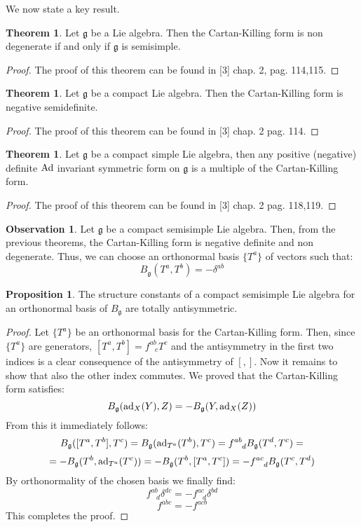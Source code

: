 \documentclass[12pt,a4paper]{report}
\theoremstyle{definition}
\theoremstyle{Theorem}
\newtheorem{Theo}[Def]{Theorem}
\newtheorem{Prop}[Def]{Proposition}
\theoremstyle{definition}
\theoremstyle{definition}
\newtheorem{Obs}[Def]{Observation}
\begin{document}
	We now state a key result.
	\begin{Theo}\label{Theo_2.8.2}
		Let $\mathfrak{g}$ be a Lie algebra. Then the Cartan-Killing form is non degenerate if and only if $\mathfrak{g}$ is semisimple.
	\end{Theo}
	\begin{proof}
		The proof of this theorem can be found in [3] chap. 2, pag. 114,115.
	\end{proof}
	\begin{Theo}
		Let $\mathfrak{g}$ be a compact Lie algebra. Then the Cartan-Killing form is negative semidefinite.
	\end{Theo}
	\begin{proof}
		The proof of this theorem can be found in [3] chap. 2 pag. 114.
	\end{proof}
	\begin{Theo}
		Let $\mathfrak{g}$ be a compact simple Lie algebra, then any positive (negative) definite $\hbox{Ad}$ invariant symmetric form on $\mathfrak{g}$ is a multiple of the Cartan-Killing form.
	\end{Theo}
	\begin{proof}
		The proof of this theorem can be found in [3] chap. 2 pag. 118,119.
	\end{proof}
	\begin{Obs}
		Let $\mathfrak{g}$ be a compact semisimple Lie algebra. Then, from the previous theorems, the Cartan-Killing form is negative definite and non degenerate. Thus, we can choose an orthonormal basis $\{T^a\}$ of vectors such that:
		$$B_{\mathfrak{g}}(T^a,T^b)=-\delta^{ab}$$
	\end{Obs}
	\begin{Prop}\label{Prop_2.8.3}
		The structure constants of a compact semisimple Lie algebra for an orthonormal basis of $B_\mathfrak{g}$ are totally antisymmetric.
	\end{Prop}
	\begin{proof}
		Let $\{T^a\}$ be an orthonormal basis for the Cartan-Killing form. Then, since $\{T^a\}$ are generators, $[T^a,T^b]=f^{ab}_{\hspace{9pt}c}T^c$ and the antisymmetry in the first two indices is a clear consequence of the antisymmetry of $[,]$. Now it remains to show that also the other index commutes. 
		We proved that the Cartan-Killing form satisfies:
		$$B_\mathfrak{g}(\hbox{ad}_X(Y),Z)=-B_\mathfrak{g}(Y,\hbox{ad}_X(Z))$$
		From this it immediately follows:
		$$B_\mathfrak{g}([T^a,T^b],T^c)=B_\mathfrak{g}(\hbox{ad}_{T^a}(T^b),T^c)=f^{ab}_{\hspace{9pt}d}B_\mathfrak{g}(T^d,T^c)=$$
		$$=-B_\mathfrak{g}(T^b,\hbox{ad}_{T^a}(T^c))=-B_\mathfrak{g}(T^b,[T^a,T^c])=-f^{ac}_{\hspace{9pt}d}B_\mathfrak{g}(T^c,T^d)$$
		By orthonormality of the chosen basis we finally find:
		$$f^{ab}_{\hspace{9pt}d}\delta^{dc}=-f^{ac}_{\hspace{9pt}d}\delta^{bd}$$
		$$f^{abc}=-f^{acb}$$
		This completes the proof.
	\end{proof}
\end{document}
